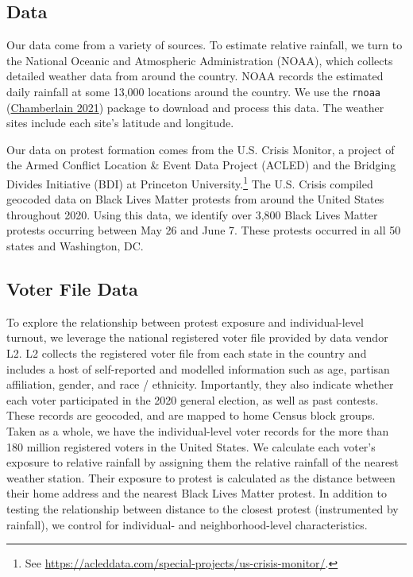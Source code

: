 \documentclass[
  12pt,
]{article}
\begin{document}
\hypertarget{data}{%
\subsection*{Data}\label{data}}

Our data come from a variety of sources. To estimate relative rainfall, we turn to the National Oceanic and Atmospheric Administration (NOAA), which collects detailed weather data from around the country. NOAA records the estimated daily rainfall at some 13,000 locations around the country. We use the \texttt{rnoaa} (\protect\hyperlink{ref-Chamberlain2021}{Chamberlain 2021}) package to download and process this data. The weather sites include each site's latitude and longitude.

Our data on protest formation comes from the U.S. Crisis Monitor, a project of the Armed Conflict Location \& Event Data Project (ACLED) and the Bridging Divides Initiative (BDI) at Princeton University.\footnote{See \url{https://acleddata.com/special-projects/us-crisis-monitor/}.} The U.S. Crisis compiled geocoded data on Black Lives Matter protests from around the United States throughout 2020. Using this data, we identify over 3,800 Black Lives Matter protests occurring between May 26 and June 7. These protests occurred in all 50 states and Washington, DC.

\hypertarget{voter-file-data}{%
\subsection*{Voter File Data}\label{voter-file-data}}

To explore the relationship between protest exposure and individual-level turnout, we leverage the national registered voter file provided by data vendor L2. L2 collects the registered voter file from each state in the country and includes a host of self-reported and modelled information such as age, partisan affiliation, gender, and race / ethnicity. Importantly, they also indicate whether each voter participated in the 2020 general election, as well as past contests. These records are geocoded, and are mapped to home Census block groups. Taken as a whole, we have the individual-level voter records for the more than 180 million registered voters in the United States. We calculate each voter's exposure to relative rainfall by assigning them the relative rainfall of the nearest weather station. Their exposure to protest is calculated as the distance between their home address and the nearest Black Lives Matter protest. In addition to testing the relationship between distance to the closest protest (instrumented by rainfall), we control for individual- and neighborhood-level characteristics.
\end{document}
